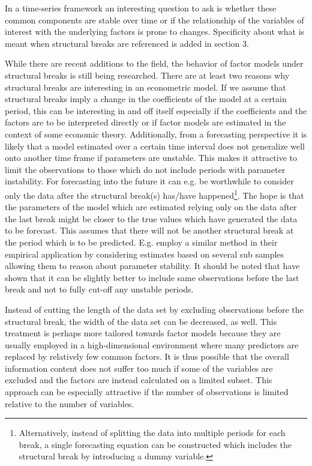 \documentclass[12pt]{article}
\begin{document}
In a time-series framework an interesting question to ask is whether these common components are stable over time or if the relationship of the variables of interest with the underlying factors is prone to changes. Specificity about what is meant when structural breaks are referenced is added in section 3. 

While there are recent additions to the field, the behavior of factor models under structural breaks is still being researched. There are at least two reasons why structural breaks are interesting in an econometric model. If we assume that structural breaks imply a change in the coefficients of the model at a certain period, this can be interesting in and off itself especially if the coefficients and the factors are to be interpreted directly or if factor models are estimated in the context of some economic theory. Additionally, from a forecasting perspective it is likely that a model estimated over a certain time interval does not generalize well onto another time frame if parameters are unstable. This makes it attractive to limit the observations to those which do not include periods with parameter instability. For forecasting into the future it can e.g. be worthwhile to consider only the data after the structural break(s) has/have happened\footnote{Alternatively, instead of splitting the data into multiple periods for each break, a single forecasting equation can be constructed which includes the structural break by introducing a dummy variable.}. The hope is that the parameters of the model which are estimated relying only on the data after the last break might be closer to the true values which have generated the data to be forecast. This assumes that there will not be another structural break at the period which is to be predicted. E.g. \citet{bai2008forecasting} employ a similar method in their empirical application by considering estimates based on several sub samples allowing them to reason about parameter stability.
It should be noted that \citet{pesaran2007selection} have shown that it can be slightly better to include same observations before the last break and not to fully cut-off any unstable periods.

Instead of cutting the length of the data set by excluding observations before the structural break, the width of the data set can be decreased, as well. This treatment is perhaps more tailored towards factor models because they are usually employed in a high-dimensional environment where many predictors are replaced by relatively few common factors. It is thus possible that the overall information content does not suffer too much if some of the variables are excluded and the factors are instead calculated on a limited subset. This approach can be especially attractive if the number of observations is limited relative to the number of variables.
\end{document}
